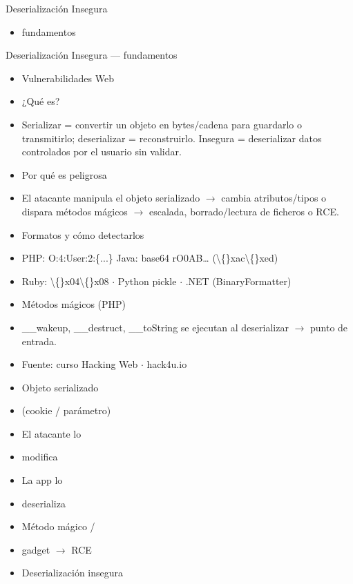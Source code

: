 \documentclass[aspectratio=169,10pt]{beamer}
\begin{document}
\begin{frame}[allowframebreaks]{Deserialización Insegura}
\small
  \begin{itemize}
  \item fundamentos
  \end{itemize}
\end{frame}

\begin{frame}[allowframebreaks]{Deserialización Insegura --- fundamentos}
\small
  \begin{itemize}
  \item Vulnerabilidades Web
  \item ¿Qué es?
  \item Serializar = convertir un objeto en bytes/cadena para guardarlo o transmitirlo; deserializar = reconstruirlo. Insegura = deserializar datos controlados por el usuario sin validar.
  \item Por qué es peligrosa
  \item El atacante manipula el objeto serializado $\rightarrow$ cambia atributos/tipos o dispara métodos mágicos $\rightarrow$ escalada, borrado/lectura de ficheros o RCE.
  \item Formatos y cómo detectarlos
  \item PHP: O:4:\textquotedbl{}User\textquotedbl{}:2:\{...\} Java: base64 rO0AB\dots{} (\textbackslash\{\}xac\textbackslash\{\}xed)
  \item Ruby: \textbackslash\{\}x04\textbackslash\{\}x08 $\cdot$ Python pickle $\cdot$ .NET (BinaryFormatter)
  \item Métodos mágicos (PHP)
  \item \_\_wakeup, \_\_destruct, \_\_toString se ejecutan al deserializar $\rightarrow$ punto de entrada.
  \item Fuente: curso Hacking Web $\cdot$ hack4u.io
  \item Objeto serializado
  \item (cookie / parámetro)
  \item El atacante lo
  \item modifica
  \item La app lo
  \item deserializa
  \item Método mágico /
  \item gadget $\rightarrow$ RCE
  \item Deserialización insegura
  \end{itemize}
\end{frame}
\end{document}
